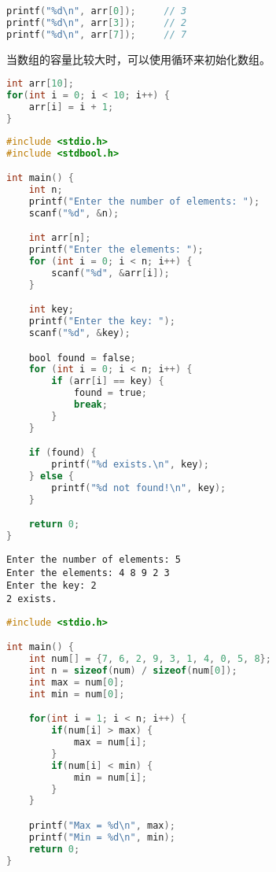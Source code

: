\begin{lstlisting}[language=C]
printf("%d\n", arr[0]);		// 3
printf("%d\n", arr[3]);		// 2
printf("%d\n", arr[7]);		// 7
\end{lstlisting}

当数组的容量比较大时，可以使用循环来初始化数组。

\vspace{-0.5cm}

\begin{lstlisting}[language=C]
int arr[10];
for(int i = 0; i < 10; i++) {
	arr[i] = i + 1;
}
\end{lstlisting}

\vspace{0.5cm}


\begin{lstlisting}[language=C]
#include <stdio.h>
#include <stdbool.h>

int main() {
	int n;
	printf("Enter the number of elements: ");
	scanf("%d", &n);

	int arr[n];
	printf("Enter the elements: ");
	for (int i = 0; i < n; i++) {
		scanf("%d", &arr[i]);
	}

	int key;
	printf("Enter the key: ");
	scanf("%d", &key);

	bool found = false;
	for (int i = 0; i < n; i++) {
		if (arr[i] == key) {
			found = true;
			break;
		}
	}

	if (found) {
		printf("%d exists.\n", key);
	} else {
		printf("%d not found!\n", key);
	}

	return 0;
}
\end{lstlisting}

\begin{tcolorbox}
	\begin{verbatim}
Enter the number of elements: 5
Enter the elements: 4 8 9 2 3
Enter the key: 2
2 exists.
	\end{verbatim}
\end{tcolorbox}

\vspace{0.5cm}


\begin{lstlisting}[language=C]
#include <stdio.h>

int main() {
	int num[] = {7, 6, 2, 9, 3, 1, 4, 0, 5, 8};
	int n = sizeof(num) / sizeof(num[0]);
	int max = num[0];
	int min = num[0];

	for(int i = 1; i < n; i++) {
		if(num[i] > max) {
			max = num[i];
		}
		if(num[i] < min) {
			min = num[i];
		}
	}

	printf("Max = %d\n", max);
	printf("Min = %d\n", min);
	return 0;
}
\end{lstlisting}

